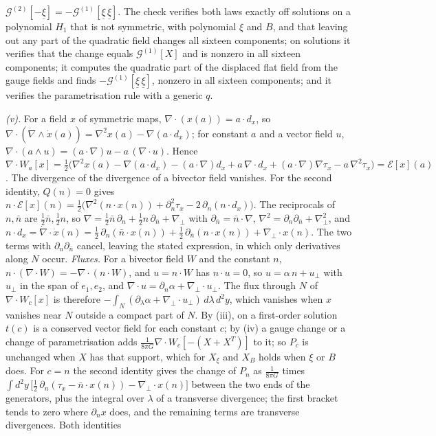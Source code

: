 $\mathcal{G}^{(2)}[-\underline{\xi}] = -\mathcal{G}^{(1)}[\underline{\xi}\,\underline{\xi}]$. The check verifies both laws exactly off solutions on a polynomial $H_{1}$ that is not symmetric, with polynomial $\xi$ and $B$, and that leaving out any part of the quadratic field changes all sixteen components; on solutions it verifies that the change equals $\mathcal{G}^{(1)}[X]$ and is nonzero in all sixteen components; it computes the quadratic part of the displaced flat field from the gauge fields and finds $-\mathcal{G}^{(1)}[\underline{\xi}\,\underline{\xi}]$, nonzero in all sixteen components; and it verifies the parametrisation rule with a generic $q$.

\emph{(v).} For a field $x$ of symmetric maps, $\nabla \cdot (x(a)) = a \cdot d_{x}$, so $\nabla \cdot (\dot\nabla \wedge \dot x(a)) = \nabla^{2}x(a) - \nabla(a \cdot d_{x})$; for constant $a$ and a vector field $u$, $\nabla \cdot (a \wedge u) = (a \cdot \nabla)u - a\,(\nabla \cdot u)$. Hence $\nabla \cdot W_{a}[x] = \tfrac12\bigl(\nabla^{2}x(a) - \nabla(a \cdot d_{x}) - (a \cdot \nabla)d_{x} + a\,\nabla \cdot d_{x} + (a \cdot \nabla)\nabla\tau_{x} - a\,\nabla^{2}\tau_{x}\bigr) = \mathcal{E}[x](a)$. The divergence of the divergence of a bivector field vanishes. For the second identity, $Q(n) = 0$ gives $n \cdot \mathcal{E}[x](n) = \tfrac12\bigl(\nabla^{2}(n \cdot x(n)) + \partial_{n}^{2}\tau_{x} - 2\,\partial_{n}(n \cdot d_{x})\bigr)$. The reciprocals of $n, \bar n$ are $\tfrac12\bar n, \tfrac12 n$, so $\nabla = \tfrac12\bar n\,\partial_{n} + \tfrac12 n\,\partial_{\bar n} + \nabla_{\perp}$ with $\partial_{\bar n} = \bar n \cdot \nabla$, $\nabla^{2} = \partial_{n}\partial_{\bar n} + \nabla_{\perp}^{2}$, and $n \cdot d_{x} = \dot\nabla \cdot \dot x(n) = \tfrac12\,\partial_{n}(\bar n \cdot x(n)) + \tfrac12\,\partial_{\bar n}(n \cdot x(n)) + \nabla_{\perp} \cdot x(n)$. The two terms with $\partial_{n}\partial_{\bar n}$ cancel, leaving the stated expression, in which only derivatives along $N$ occur. \emph{Fluxes.} For a bivector field $W$ and the constant $n$, $n \cdot (\nabla \cdot W) = -\nabla \cdot (n \cdot W)$, and $u = n \cdot W$ has $n \cdot u = 0$, so $u = \alpha\,n + u_{\perp}$ with $u_{\perp}$ in the span of $e_{1}, e_{2}$, and $\nabla \cdot u = \partial_{n}\alpha + \nabla_{\perp} \cdot u_{\perp}$. The flux through $N$ of $\nabla \cdot W_{c}[x]$ is therefore $-\int_{N}(\partial_{\lambda}\alpha + \nabla_{\perp} \cdot u_{\perp})\,d\lambda\,d^{2}y$, which vanishes when $x$ vanishes near $N$ outside a compact part of $N$. By (iii), on a first-order solution $t(c)$ is a conserved vector field for each constant $c$; by (iv) a gauge change or a change of parametrisation adds $\tfrac{1}{8\pi G}\nabla \cdot W_{c}[-(X + X^{T})]$ to it; so $P_{c}$ is unchanged when $X$ has that support, which for $X_{\xi}$ and $X_{B}$ holds when $\xi$ or $B$ does. For $c = n$ the second identity gives the change of $P_{n}$ as $\tfrac{1}{8\pi G}$ times $\int d^{2}y\,\bigl[\tfrac12\,\partial_{n}(\tau_{x} - \bar n \cdot x(n)) - \nabla_{\perp} \cdot x(n)\bigr]$ between the two ends of the generators, plus the integral over $\lambda$ of a transverse divergence; the first bracket tends to zero where $\partial_{n}x$ does, and the remaining terms are transverse divergences. Both identities 